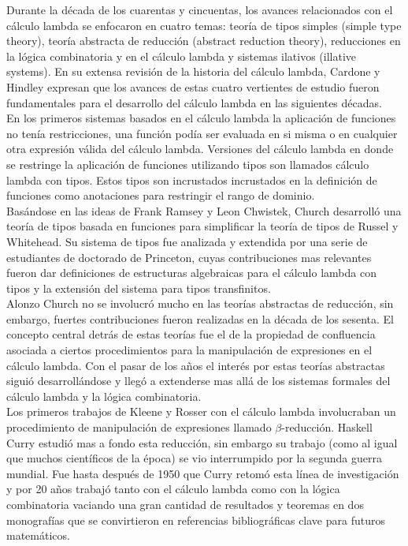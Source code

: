 Durante la década de los cuarentas y cincuentas, los avances
relacionados con el cálculo lambda se enfocaron en cuatro temas: teoría de
tipos simples (simple type theory), teoría abstracta de reducción
(abstract reduction theory), reducciones en la lógica
combinatoria y en el cálculo lambda y sistemas ilativos (illative systems). En
su extensa revisión de la historia del cálculo lambda, Cardone y Hindley
expresan que  los avances de estas cuatro vertientes de estudio fueron
fundamentales para el desarrollo del cálculo lambda en las siguientes
décadas.\\

En los primeros sistemas basados en el cálculo lambda la aplicación de
funciones no tenía restricciones, una función podía ser evaluada en si
misma o en cualquier otra expresión válida del cálculo lambda. Versiones del
cálculo lambda en donde se restringe la aplicación de funciones utilizando
tipos son llamados cálculo lambda con tipos. Estos tipos son incrustados
incrustados en la definición de funciones como anotaciones para
restringir el rango de dominio.\\

Basándose en las ideas de Frank Ramsey y Leon Chwistek, Church
desarrolló una teoría de tipos basada en funciones para simplificar la
teoría de tipos de Russel y Whitehead. Su sistema de tipos fue
analizada y extendida por una serie de estudiantes de doctorado de
Princeton, cuyas contribuciones mas relevantes fueron dar definiciones
de estructuras algebraicas para el cálculo lambda con tipos y la extensión del
sistema para tipos transfinitos.\\

Alonzo Church no se involucró mucho en las teorías abstractas de
reducción, sin embargo, fuertes contribuciones fueron realizadas en la
década de los sesenta. El concepto central detrás de estas teorías fue
el de la propiedad de confluencia asociada a ciertos procedimientos
para la manipulación de expresiones en el cálculo lambda. Con el pasar de los
años el interés por estas teorías abstractas siguió desarrollándose y
llegó a extenderse mas allá de los sistemas formales del cálculo lambda y la
lógica combinatoria.\\

Los primeros trabajos de Kleene y Rosser con el cálculo lambda involucraban un
procedimiento de manipulación de expresiones llamado \(\beta\)-reducción. Haskell
Curry estudió mas a fondo esta reducción, sin embargo su trabajo (como
al igual que muchos científicos de la época) se vio interrumpido por
la segunda guerra mundial. Fue hasta después de 1950 que Curry retomó
esta línea de investigación y por 20 años trabajó tanto con el cálculo lambda
como con la lógica combinatoria vaciando una gran cantidad de
resultados y teoremas en dos monografías que se convirtieron en
referencias bibliográficas clave para futuros matemáticos.\\

